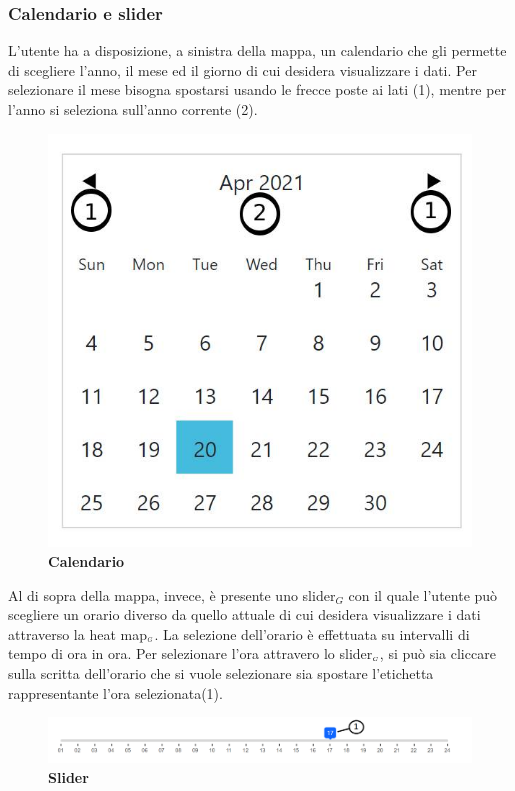 \subsubsection{Calendario e slider}\label{UtilizzoDiGDPGatheringDetecionPlatformContenutoCentralePaginaInizialeHomeCalendarioESlider}
L'utente ha a disposizione, a sinistra della mappa, un calendario che gli permette di scegliere l'anno, il mese ed il giorno di cui desidera visualizzare i dati. Per selezionare il mese bisogna spostarsi usando le frecce poste ai lati (1), mentre per l'anno si seleziona sull'anno corrente (2).
\begin{center}
	\begin{figure}[H]
		\centering\includegraphics[width=0.3\linewidth]{../immagini/manualeUtente/Calendario.jpg}
		\caption{\textbf{Calendario}}
	\end{figure}
\end{center}
Al di sopra della mappa, invece, è presente uno slider$_G$ con il quale l'utente può scegliere un orario diverso da quello attuale di cui desidera visualizzare i dati attraverso la heat map$_{\scaleto{G}{3pt}}$. La selezione dell'orario è effettuata su intervalli di tempo di ora in ora. Per selezionare l'ora attravero lo slider$_{\scaleto{G}{3pt}}$, si può sia cliccare sulla scritta dell'orario che si vuole selezionare sia spostare l'etichetta rappresentante l'ora selezionata(1).
\begin{center}
	\begin{figure}[H]
		\centering\includegraphics[width=1\linewidth]{../immagini/manualeUtente/Slider.png}
		\caption{\textbf{Slider}}
	\end{figure}
\end{center}

